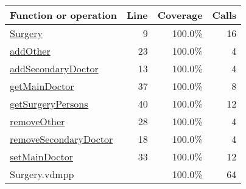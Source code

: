 \begin{longtable}{|l|r|r|r|}
\hline
Function or operation & Line & Coverage & Calls \\
\hline
\hline
\hyperref[Surgery:9]{Surgery} & 9&100.0\% & 16 \\
\hline
\hyperref[addOther:23]{addOther} & 23&100.0\% & 4 \\
\hline
\hyperref[addSecondaryDoctor:13]{addSecondaryDoctor} & 13&100.0\% & 4 \\
\hline
\hyperref[getMainDoctor:37]{getMainDoctor} & 37&100.0\% & 8 \\
\hline
\hyperref[getSurgeryPersons:40]{getSurgeryPersons} & 40&100.0\% & 12 \\
\hline
\hyperref[removeOther:28]{removeOther} & 28&100.0\% & 4 \\
\hline
\hyperref[removeSecondaryDoctor:18]{removeSecondaryDoctor} & 18&100.0\% & 4 \\
\hline
\hyperref[setMainDoctor:33]{setMainDoctor} & 33&100.0\% & 12 \\
\hline
\hline
Surgery.vdmpp & & 100.0\% & 64 \\
\hline
\end{longtable}

